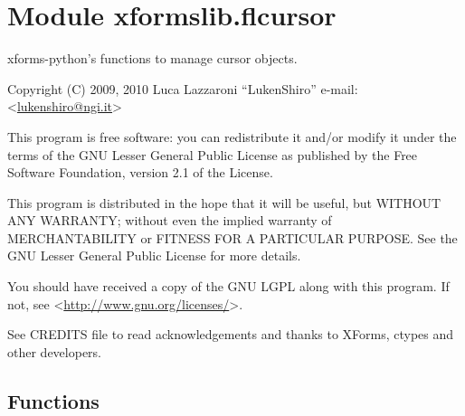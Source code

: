 %
%
%


\section{Module xformslib.flcursor}

    \label{xformslib:flcursor}

xforms-python's functions to manage cursor objects.

Copyright (C) 2009, 2010  Luca Lazzaroni ``LukenShiro''
e-mail: <\href{mailto:lukenshiro@ngi.it}{lukenshiro@ngi.it}>

This program is free software: you can redistribute it and/or modify
it under the terms of the GNU Lesser General Public License as
published by the Free Software Foundation, version 2.1 of the License.

This program is distributed in the hope that it will be useful,
but WITHOUT ANY WARRANTY; without even the implied warranty of
MERCHANTABILITY or FITNESS FOR A PARTICULAR PURPOSE. See the
GNU Lesser General Public License for more details.

You should have received a copy of the GNU LGPL along with this
program. If not, see <\href{http://www.gnu.org/licenses/}{http://www.gnu.org/licenses/}>.

See CREDITS file to read acknowledgements and thanks to XForms,
ctypes and other developers.


  \subsection{Functions}

    \label{xformslib:flcursor:fl_set_cursor}

